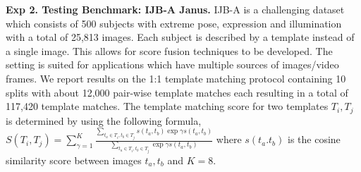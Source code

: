 \documentclass[10pt,twocolumn,letterpaper]{article}
\begin{document}




\textbf{Exp 2. Testing Benchmark: IJB-A Janus.} IJB-A \cite{klare2015pushing} is a challenging dataset which consists of 500 subjects with  extreme pose, expression and illumination with a total of 25,813 images. Each subject is described by a template instead of a single image. This allows for score fusion techniques to be developed. The setting is suited for applications which have multiple sources of images/video frames. We report results on the 1:1 template matching protocol containing 10 splits with about 12,000 pair-wise template matches each resulting in a total of 117,420 template matches. The template matching score for two templates $T_i, T_j$ is determined by using the following formula, $S(T_i, T_j) =  \sum_{\gamma=1}^K \frac{\sum_{t_a\in T_i, t_b\in T_j}  s(t_a, t_b)  \exp{ \gamma s(t_a, t_b) } }{  \sum_{t_a\in T_i, t_b\in T_j} \exp{ \gamma s(t_a, t_b) }   } $ where $s(t_a. t_b)$ is the cosine similarity score between images $t_a, t_b$ and $K=8$. 

\end{document}
